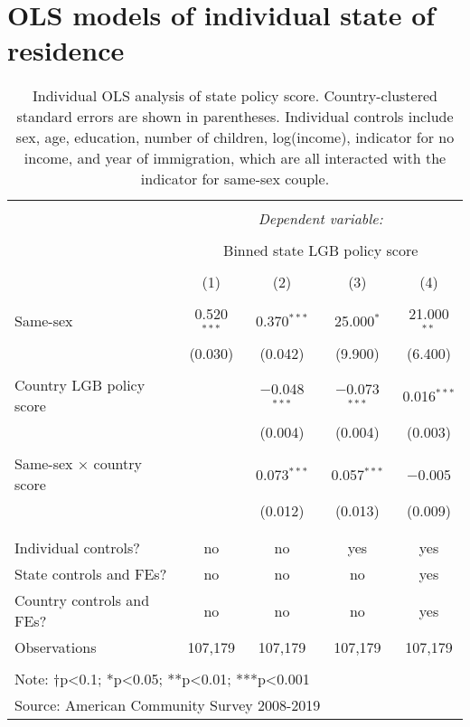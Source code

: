 \documentclass[
  11pt,
]{article}
\begin{document}
\newpage

\hypertarget{ols-models-of-individual-state-of-residence}{%
\section{OLS models of individual state of residence}\label{ols-models-of-individual-state-of-residence}}

\begin{table}[!htbp] \centering 
  \caption{Individual OLS analysis of state policy score. Country-clustered standard errors are shown in parentheses. Individual controls include sex, age, education, number of children, log(income), indicator for no income, and year of immigration, which are all interacted with the indicator for same-sex couple.} 
  \label{tab:ols} 
\begin{tabular}{@{\extracolsep{5pt}}lcccc} 
\\[-1.8ex]\hline 
\hline \\[-1.8ex] 
 & \multicolumn{4}{c}{\textit{Dependent variable:}} \\ 
\cline{2-5} 
\\[-1.8ex] & \multicolumn{4}{c}{Binned state LGB policy score} \\ 
\\[-1.8ex] & (1) & (2) & (3) & (4)\\ 
\hline \\[-1.8ex] 
 Same-sex & 0.520$^{***}$ & 0.370$^{***}$ & 25.000$^{*}$ & 21.000$^{**}$ \\ 
  & (0.030) & (0.042) & (9.900) & (6.400) \\ 
  & & & & \\ 
 Country LGB policy score &  & $-$0.048$^{***}$ & $-$0.073$^{***}$ & 0.016$^{***}$ \\ 
  &  & (0.004) & (0.004) & (0.003) \\ 
  & & & & \\ 
 Same-sex × country score &  & 0.073$^{***}$ & 0.057$^{***}$ & $-$0.005 \\ 
  &  & (0.012) & (0.013) & (0.009) \\ 
  & & & & \\ 
\hline \\[-1.8ex] 
Individual controls? & no & no & yes & yes \\ 
State controls and FEs? & no & no & no & yes \\ 
Country controls and FEs? & no & no & no & yes \\ 
Observations & 107,179 & 107,179 & 107,179 & 107,179 \\ 
\hline 
\hline \\[-1.8ex] 
\multicolumn{5}{l}{Note: †p<0.1; *p<0.05; **p<0.01; ***p<0.001} \\ 
\multicolumn{5}{l}{Source: American Community Survey 2008-2019} \\ 
\end{tabular} 
\end{table}
\end{document}
